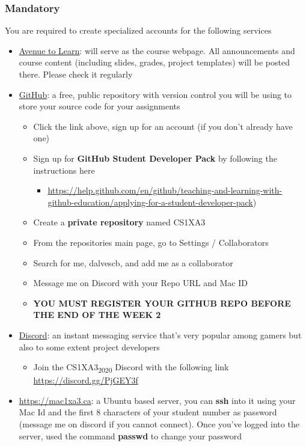 \documentclass{article}
\begin{document}
\subsubsection{Mandatory}
\label{sec:org6e59270}
You are required to create specialized accounts for the following services
\begin{itemize}
\item \href{http://avenue.mcmaster.ca/}{Avenue to Learn}: will serve as the course webpage. All announcements and
course content (including slides, grades, project templates) will be posted
there. Please check it regularly
\item \href{https://github.com}{GitHub}: a free, public repository with version control you will be using to
store your source code for your assignments
\begin{itemize}
\item Click the link above, sign up for an account (if you don't already have
one)
\item Sign up for \textbf{GitHub Student Developer Pack} by following the instructions
here
\begin{itemize}
\item \url{https://help.github.com/en/github/teaching-and-learning-with-github-education/applying-for-a-student-developer-pack})
\end{itemize}
\item Create a \textbf{private repository} named CS1XA3
\item From the repositories main page, go to Settings / Collaborators
\item Search for me, dalvescb, and add me as a collaborator
\item Message me on Discord with your Repo URL and Mac ID
\item \textbf{YOU MUST REGISTER YOUR GITHUB REPO BEFORE THE END OF THE WEEK 2}
\end{itemize}
\item \href{https://discordapp.com/}{Discord}: an instant messaging service that's very popular among gamers but
also to some extent project developers
\begin{itemize}
\item Join the CS1XA3\textsubscript{2020} Discord with the following link \url{https://discord.gg/PjGEY3f}
\end{itemize}
\item \url{https://mac1xa3.ca}: a Ubuntu based server, you can \textbf{ssh} into it using your Mac Id
and the first 8 characters of your student number as password (message me
on discord if you cannot connect). Once you've logged into the server, used
the command \textbf{passwd} to change your password
\end{itemize}
\end{document}
